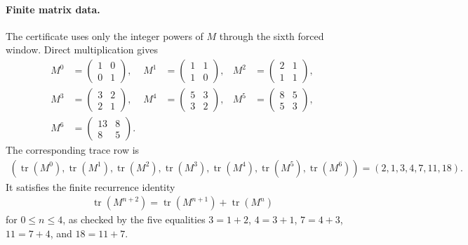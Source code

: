 \paragraph{Finite matrix data.}
The certificate uses only the integer powers of $M$ through the sixth forced window.  Direct multiplication gives
$$
\begin{aligned}
M^0&=\begin{pmatrix}1&0\\0&1\end{pmatrix},&
M^1&=\begin{pmatrix}1&1\\1&0\end{pmatrix},&
M^2&=\begin{pmatrix}2&1\\1&1\end{pmatrix},\\
M^3&=\begin{pmatrix}3&2\\2&1\end{pmatrix},&
M^4&=\begin{pmatrix}5&3\\3&2\end{pmatrix},&
M^5&=\begin{pmatrix}8&5\\5&3\end{pmatrix},\\
M^6&=\begin{pmatrix}13&8\\8&5\end{pmatrix}.&&
\end{aligned}
$$
The corresponding trace row is
$$
\begin{aligned}
(\operatorname{tr}(M^0),\operatorname{tr}(M^1),\operatorname{tr}(M^2),\operatorname{tr}(M^3),\operatorname{tr}(M^4),\operatorname{tr}(M^5),\operatorname{tr}(M^6))
=(2,1,3,4,7,11,18).
\end{aligned}
$$
It satisfies the finite recurrence identity
$$
\begin{aligned}
\operatorname{tr}(M^{n+2})=\operatorname{tr}(M^{n+1})+\operatorname{tr}(M^n)
\end{aligned}
$$
for $0\leq n\leq 4$, as checked by the five equalities $3=1+2$, $4=3+1$, $7=4+3$, $11=7+4$, and $18=11+7$.

